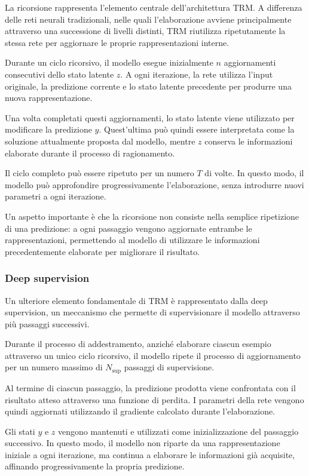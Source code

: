 La ricorsione rappresenta l'elemento centrale dell'architettura TRM. A differenza delle reti neurali tradizionali, nelle quali l'elaborazione avviene principalmente attraverso una successione di livelli distinti, TRM riutilizza ripetutamente la stessa rete per aggiornare le proprie rappresentazioni interne.

Durante un ciclo ricorsivo, il modello esegue inizialmente \(n\) aggiornamenti consecutivi dello stato latente \(z\). A ogni iterazione, la rete utilizza l'input originale, la predizione corrente e lo stato latente precedente per produrre una nuova rappresentazione.

Una volta completati questi aggiornamenti, lo stato latente viene utilizzato per modificare la predizione \(y\). Quest'ultima può quindi essere interpretata come la soluzione attualmente proposta dal modello, mentre \(z\) conserva le informazioni elaborate durante il processo di ragionamento.

Il ciclo completo può essere ripetuto per un numero \(T\) di volte. In questo modo, il modello può approfondire progressivamente l'elaborazione, senza introdurre nuovi parametri a ogni iterazione.

Un aspetto importante è che la ricorsione non consiste nella semplice ripetizione di una predizione: a ogni passaggio vengono aggiornate entrambe le rappresentazioni, permettendo al modello di utilizzare le informazioni precedentemente elaborate per migliorare il risultato.

\subsubsection{Deep supervision}

Un ulteriore elemento fondamentale di TRM è rappresentato dalla deep supervision, un meccanismo che permette di supervisionare il modello attraverso più passaggi successivi.

Durante il processo di addestramento, anziché elaborare ciascun esempio attraverso un unico ciclo ricorsivo, il modello ripete il processo di aggiornamento per un numero massimo di \(N_{\text{sup}}\) passaggi di supervisione.

Al termine di ciascun passaggio, la predizione prodotta viene confrontata con il risultato atteso attraverso una funzione di perdita. I parametri della rete vengono quindi aggiornati utilizzando il gradiente calcolato durante l'elaborazione.

Gli stati \(y\) e \(z\) vengono mantenuti e utilizzati come inizializzazione del passaggio successivo. In questo modo, il modello non riparte da una rappresentazione iniziale a ogni iterazione, ma continua a elaborare le informazioni già acquisite, affinando progressivamente la propria predizione.

